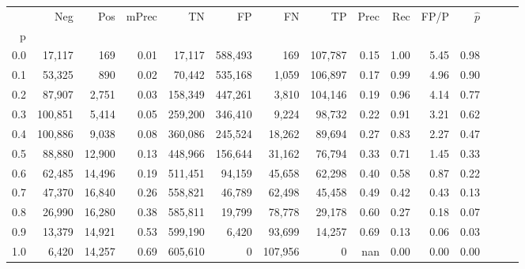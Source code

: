 \begin{tabular}{rrrrrrrrrrrrrrr}
\toprule
{} &      Neg &     Pos & mPrec &       TN &       FP &       FN &       TP &  Prec &   Rec &  FP/P & $\hat{p}$ \\
p   &          &         &       &          &          &          &          &       &       &       &           \\
\midrule
0.0 &   17,117 &     169 &  0.01 &   17,117 &  588,493 &      169 &  107,787 &  0.15 &  1.00 &  5.45 &      0.98 \\
0.1 &   53,325 &     890 &  0.02 &   70,442 &  535,168 &    1,059 &  106,897 &  0.17 &  0.99 &  4.96 &      0.90 \\
0.2 &   87,907 &   2,751 &  0.03 &  158,349 &  447,261 &    3,810 &  104,146 &  0.19 &  0.96 &  4.14 &      0.77 \\
0.3 &  100,851 &   5,414 &  0.05 &  259,200 &  346,410 &    9,224 &   98,732 &  0.22 &  0.91 &  3.21 &      0.62 \\
0.4 &  100,886 &   9,038 &  0.08 &  360,086 &  245,524 &   18,262 &   89,694 &  0.27 &  0.83 &  2.27 &      0.47 \\
0.5 &   88,880 &  12,900 &  0.13 &  448,966 &  156,644 &   31,162 &   76,794 &  0.33 &  0.71 &  1.45 &      0.33 \\
0.6 &   62,485 &  14,496 &  0.19 &  511,451 &   94,159 &   45,658 &   62,298 &  0.40 &  0.58 &  0.87 &      0.22 \\
0.7 &   47,370 &  16,840 &  0.26 &  558,821 &   46,789 &   62,498 &   45,458 &  0.49 &  0.42 &  0.43 &      0.13 \\
0.8 &   26,990 &  16,280 &  0.38 &  585,811 &   19,799 &   78,778 &   29,178 &  0.60 &  0.27 &  0.18 &      0.07 \\
0.9 &   13,379 &  14,921 &  0.53 &  599,190 &    6,420 &   93,699 &   14,257 &  0.69 &  0.13 &  0.06 &      0.03 \\
1.0 &    6,420 &  14,257 &  0.69 &  605,610 &        0 &  107,956 &        0 &   nan &  0.00 &  0.00 &      0.00 \\
\bottomrule
\end{tabular}
